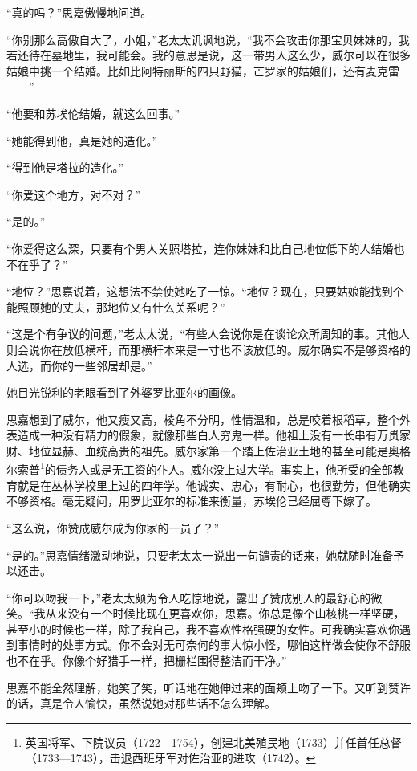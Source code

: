 \par “真的吗？”思嘉傲慢地问道。
\par “你别那么高傲自大了，小姐，”老太太讥讽地说，“我不会攻击你那宝贝妹妹的，我若还待在墓地里，我可能会。我的意思是说，这一带男人这么少，威尔可以在很多姑娘中挑一个结婚。比如比阿特丽斯的四只野猫，芒罗家的姑娘们，还有麦克雷——”
\par “他要和苏埃伦结婚，就这么回事。”
\par “她能得到他，真是她的造化。”
\par “得到他是塔拉的造化。”
\par “你爱这个地方，对不对？”
\par “是的。”
\par “你爱得这么深，只要有个男人关照塔拉，连你妹妹和比自己地位低下的人结婚也不在乎了？”
\par “地位？”思嘉说着，这想法不禁使她吃了一惊。“地位？现在，只要姑娘能找到个能照顾她的丈夫，那地位又有什么关系呢？”
\par “这是个有争议的问题，”老太太说，“有些人会说你是在谈论众所周知的事。其他人则会说你在放低横杆，而那横杆本来是一寸也不该放低的。威尔确实不是够资格的人选，而你的一些邻居却是。”
\par 她目光锐利的老眼看到了外婆罗比亚尔的画像。
\par 思嘉想到了威尔，他又瘦又高，棱角不分明，性情温和，总是咬着根稻草，整个外表造成一种没有精力的假象，就像那些白人穷鬼一样。他祖上没有一长串有万贯家财、地位显赫、血统高贵的祖先。威尔家第一个踏上佐治亚土地的甚至可能是奥格尔索普\footnote{英国将军、下院议员（1722—1754），创建北美殖民地（1733）并任首任总督（1733—1743），击退西班牙军对佐治亚的进攻（1742）。}的债务人或是无工资的仆人。威尔没上过大学。事实上，他所受的全部教育就是在丛林学校里上过的四年学。他诚实、忠心，有耐心，也很勤劳，但他确实不够资格。毫无疑问，用罗比亚尔的标准来衡量，苏埃伦已经屈尊下嫁了。
\par “这么说，你赞成威尔成为你家的一员了？”
\par “是的。”思嘉情绪激动地说，只要老太太一说出一句谴责的话来，她就随时准备予以还击。
\par “你可以吻我一下，”老太太颇为令人吃惊地说，露出了赞成别人的最舒心的微笑。“我从来没有一个时候比现在更喜欢你，思嘉。你总是像个山核桃一样坚硬，甚至小的时候也一样，除了我自己，我不喜欢性格强硬的女性。可我确实喜欢你遇到事情时的处事方式。你不会对无可奈何的事大惊小怪，哪怕这样做会使你不舒服也不在乎。你像个好猎手一样，把栅栏围得整洁而干净。”
\par 思嘉不能全然理解，她笑了笑，听话地在她伸过来的面颊上吻了一下。又听到赞许的话，真是令人愉快，虽然说她对那些话不怎么理解。
